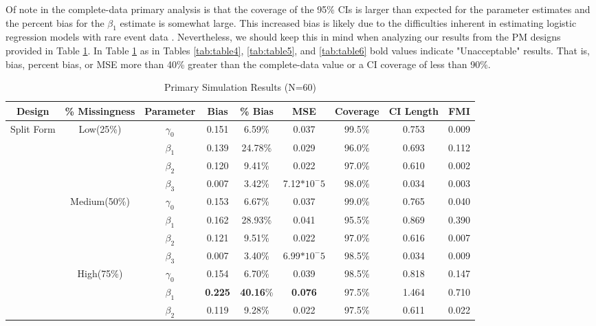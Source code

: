 \documentclass{svjour3}\usepackage[]{graphicx}\usepackage[]{color}
\begin{document}
Of note in the complete-data primary analysis is that the coverage of the 95\% CIs is larger than expected for the parameter estimates and the percent bias for the $\beta_1$ estimate is somewhat large. This increased bias is likely due to the difficulties inherent in estimating logistic regression models with rare event data \citep{king2001logistic}. Nevertheless, we should keep this in mind when analyzing our results from the PM designs provided in Table \ref{tab:table3}. In Table \ref{tab:table3} as in Tables \ref{tab:table4}, \ref{tab:table5}, and \ref{tab:table6} bold values indicate "Unacceptable" results. That is, bias, percent bias, or MSE more than 40\% greater than the complete-data value or a CI coverage of less than 90\%.

\begin{table}[p]
	\centering
	\caption{Primary Simulation Results (N=60)}
	\setlength{\tabcolsep}{0.1cm}
	\label{tab:table3}
	\hspace*{-1cm}
	\begin{tabular}{c|c|c|cccccc}
		\toprule
		Design & \% Missingness & Parameter & Bias & \% Bias & MSE & Coverage & CI Length & FMI \\
		\midrule
		\multirow{12}{*}{Split Form}
		& \multirow{4}{*}{Low(25\%)}
		& $\gamma_0$ & 0.151 & 6.59\% & 0.037 & 99.5\% & 0.753 & 0.009 \\
		&& $\beta_1$ & 0.139 & 24.78\% & 0.029 & 96.0\% & 0.693 & 0.112 \\
		&& $\beta_2$ & 0.120 & 9.41\% & 0.022 & 97.0\% & 0.610 & 0.002 \\
		&& $\beta_3$ & 0.007 & 3.42\% & 7.12$*10^-5$ & 98.0\% & 0.034 & 0.003 \\ \cline{2-9} \noalign{\smallskip}
		&\multirow{4}{*}{Medium(50\%)}
		& $\gamma_0$ & 0.153 & 6.67\% & 0.037 & 99.0\% & 0.765 & 0.040 \\
		&& $\beta_1$ & 0.162 & 28.93\% & 0.041 & 95.5\% & 0.869 & 0.390 \\
		&& $\beta_2$ & 0.121 & 9.51\% & 0.022 & 97.0\% & 0.616 & 0.007 \\
		&& $\beta_3$ & 0.007 & 3.40\% & 6.99$*10^-5$ & 98.5\% & 0.034 & 0.009 \\ \cline{2-9} \noalign{\smallskip}
		& \multirow{4}{*}{High(75\%)}
		& $\gamma_0$ & 0.154 & 6.70\% & 0.039 & 98.5\% & 0.818 & 0.147 \\
		&& $\beta_1$ & \textbf{0.225} & \textbf{40.16}\% & \textbf{0.076} & 97.5\% & 1.464 & 0.710 \\
		&& $\beta_2$ & 0.119 & 9.28\% & 0.022 & 97.5\% & 0.611 & 0.022 \\

\end{tabular}
\end{table}
\end{document}

